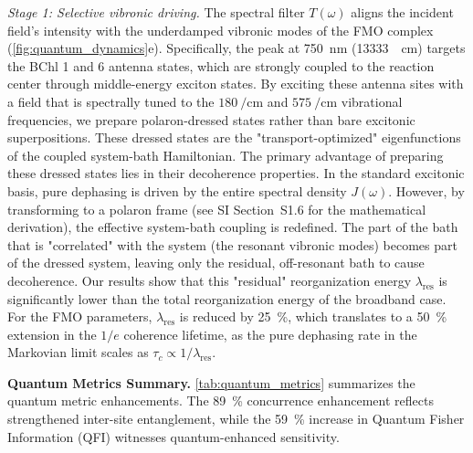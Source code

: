 \documentclass[journal=jpcl,manuscript=letter]{achemso}
\begin{document}
\textit{Stage 1: Selective vibronic driving.} The spectral filter $T(\omega)$ aligns the incident field's intensity with the underdamped vibronic modes of the FMO complex (\cref{fig:quantum_dynamics}e). Specifically, the peak at \SI{750}{\nano\meter} (\SI{13333}{\per\centi\meter}) targets the BChl 1 and 6 antenna states, which are strongly coupled to the reaction center through middle-energy exciton states. By exciting these antenna sites with a field that is spectrally tuned to the $\SI{180}{\per\centi\meter}$ and $\SI{575}{\per\centi\meter}$ vibrational frequencies, we prepare polaron-dressed states rather than bare excitonic superpositions. These dressed states are the "transport-optimized" eigenfunctions of the coupled system-bath Hamiltonian.\cite{Chin2013} The primary advantage of preparing these dressed states lies in their decoherence properties. In the standard excitonic basis, pure dephasing is driven by the entire spectral density $J(\omega)$. However, by transforming to a polaron frame (see SI Section~S1.6 for the mathematical derivation), the effective system-bath coupling is redefined. The part of the bath that is "correlated" with the system (the resonant vibronic modes) becomes part of the dressed system, leaving only the residual, off-resonant bath to cause decoherence. Our results show that this "residual" reorganization energy $\lambda_{\mathrm{res}}$ is significantly lower than the total reorganization energy of the broadband case. For the FMO parameters, $\lambda_{\mathrm{res}}$ is reduced by \SI{25}{\percent}, which translates to a \SI{50}{\percent} extension in the $1/e$ coherence lifetime, as the pure dephasing rate in the Markovian limit scales as $\tau_c \propto 1/\lambda_{\mathrm{res}}$.

\textbf{Quantum Metrics Summary.}
\cref{tab:quantum_metrics} summarizes the quantum metric enhancements. The \SI{89}{\percent} concurrence enhancement reflects strengthened inter-site entanglement, while the \SI{59}{\percent} increase in Quantum Fisher Information (QFI) witnesses quantum-enhanced sensitivity.
\end{document}
